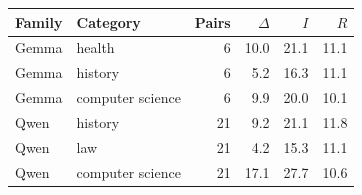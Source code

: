 \begin{tabular}{llrrrr}
\toprule
Family & Category & Pairs & $\Delta$ & $I$ & $R$ \\
\midrule
Gemma & health & 6 & 10.0 & 21.1 & 11.1 \\
Gemma & history & 6 & 5.2 & 16.3 & 11.1 \\
Gemma & computer science & 6 & 9.9 & 20.0 & 10.1 \\
Qwen & history & 21 & 9.2 & 21.1 & 11.8 \\
Qwen & law & 21 & 4.2 & 15.3 & 11.1 \\
Qwen & computer science & 21 & 17.1 & 27.7 & 10.6 \\
\bottomrule
\end{tabular}
